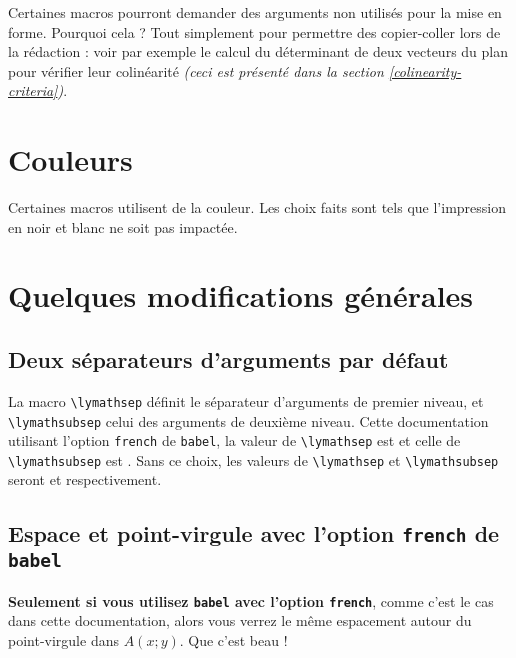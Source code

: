 \documentclass[12pt,a4paper]{article}
\newcommand\env[1]{\texttt{#1}}
\newcommand\macro[1]{\env{\textbackslash{}#1}}
\theoremstyle{definition}
\begin{document}
Certaines macros pourront demander des arguments non utilisés pour la mise en forme. Pourquoi cela ? Tout simplement pour permettre des copier-coller lors de la rédaction : voir par exemple le calcul du déterminant de deux vecteurs du plan pour vérifier leur colinéarité \emph{(ceci est présenté dans la section \ref{colinearity-criteria})}.




\section{Couleurs}

Certaines macros utilisent de la couleur. Les choix faits sont tels que l'impression en noir et blanc ne soit pas impactée.
\section{Quelques modifications générales}

\subsection{Deux séparateurs d'arguments par défaut}

La macro \macro{lymathsep} définit le séparateur d'arguments de premier niveau, et \macro{lymathsubsep} celui des arguments de deuxième niveau.
Cette documentation utilisant l'option \verb+french+ de \verb+babel+, la valeur de 
\macro{lymathsep} est \fbox{\,\lymathsep$\vphantom{F}$\,} 
et celle de
\macro{lymathsubsep} est \fbox{\,\lymathsubsep$\vphantom{F}$\,} .
Sans ce choix, les valeurs de \macro{lymathsep} et \macro{lymathsubsep} seront \fbox{\,\lymathsubsep$\vphantom{F}$\,} et \fbox{\,\lymathsep$\vphantom{F}$\,} respectivement.

\subsection{Espace et point-virgule avec l'option \texttt{french} de \texttt{babel}}

\textbf{Seulement si vous utilisez \texttt{babel} avec l'option \texttt{french}}, comme c'est le cas dans cette documentation, alors vous verrez le même espacement autour du point-virgule dans $A(x;y)$. Que c'est beau !
\end{document}

